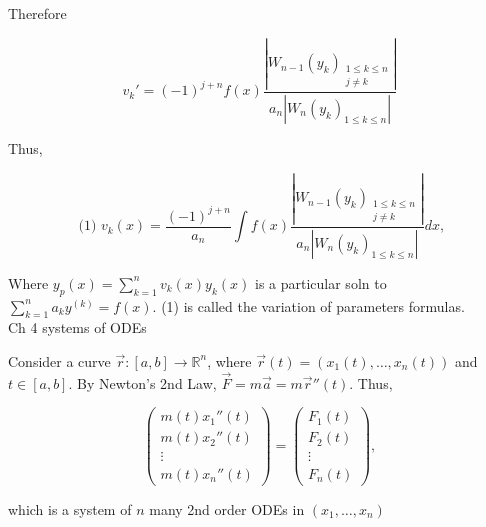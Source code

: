  Therefore 

 \[ v_k' = (-1)^{j+n}f(x) \frac{|W_{n-1}(y_k)_{\substack{1 \leq k \leq n
 \\
 j \neq k}}|}{a_n|W_n(y_k)_{1 \leq k \leq n}|}  \]

 Thus, 

 \[ \text{ (1) } v_k(x) = 
  \frac{(-1)^{j+n}}{a_n} \int f(x) \frac{|W_{n-1}(y_k)_{\substack{1 \leq
  k \leq n \\
  j \neq k}}|}{a_n|W_n(y_k)_{1 \leq k \leq n}|}  dx,
 \]

Where \( y_p(x) = \sum_{k=1}^{n}v_k(x)y_k(x) \) is a particular soln to
\( \sum_{k=1}^{n}a_ky^{(k)} = f(x) \). (1) is called the variation of
parameters formulas. \\[5mm]

Ch 4 systems of ODEs 

\begin{example}
  Consider a curve \( \vec{r}:[a,b] \to \mathbb{R}^n \), where \(
  \vec{r}(t) = (x_1(t), \dots , x_n(t)) \) and \( t \in [a,b] \). By
  Newton's 2nd Law, \( \vec{F} = m\vec{a} = m\vec{r}''(t)\). Thus, 

  \[ 
  \begin{pmatrix}
    m(t)x_1''(t) \\
    m(t)x_2''(t) \\
    \vdots \\
    m(t)x_n''(t) 
  \end{pmatrix}
  =
  \begin{pmatrix}
    F_1(t) \\
    F_2(t) \\
    \vdots \\
    F_n(t) 
  \end{pmatrix}
  ,
  \]
  
  which is a system of \( n \) many 2nd order ODEs in \( (x_1, \dots ,
  x_n) \)


\end{example}






